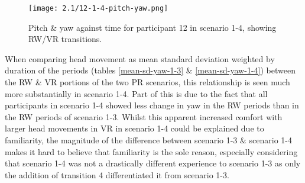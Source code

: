 
\begin{figure}[h]
	\begin{center}
	\texttt{[image: 2.1/12-1-4-pitch-yaw.png]}
	\caption{Pitch \& yaw against time for participant 12 in scenario 1-4, showing RW/VR transitions.}
	\label{12-1-4-pitch-yaw.png}
	\end{center}
\end{figure}

When comparing head movement as mean standard deviation weighted by duration of the periods (tables \ref{mean-sd-yaw-1-3} \& \ref{mean-sd-yaw-1-4}) between the RW \& VR portions of the two PR scenarios, this relationship is seen much more substantially in scenario 1-4. Part of this is due to the fact that all participants in scenario 1-4 showed less change in yaw in the RW periods than in the RW periods of scenario 1-3. Whilst this apparent increased comfort with larger head movements in VR in scenario 1-4 could be explained due to familiarity, the magnitude of the difference between scenario 1-3 \& scenario 1-4 makes it hard to believe that familiarity is the sole reason, especially considering that scenario 1-4 was not a drastically different experience to scenario 1-3 as only the addition of transition 4 differentiated it from scenario 1-3.

